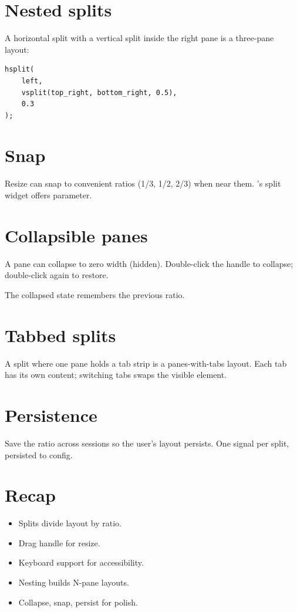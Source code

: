 \section{Nested splits}

A horizontal split with a vertical split inside the right
pane is a three-pane layout:

\begin{lstlisting}
hsplit(
    left,
    vsplit(top_right, bottom_right, 0.5),
    0.3
);
\end{lstlisting}

\section{Snap}

Resize can snap to convenient ratios (1/3, 1/2, 2/3) when
near them. \maya{}'s split widget offers 
parameter.

\section{Collapsible panes}

A pane can collapse to zero width (hidden). Double-click
the handle to collapse; double-click again to restore.

The collapsed state remembers the previous ratio.

\section{Tabbed splits}

A split where one pane holds a tab strip is a
panes-with-tabs layout. Each tab has its own content;
switching tabs swaps the visible element.

\section{Persistence}

Save the ratio across sessions so the user's layout
persists. One signal per split, persisted to config.

\section{Recap}

\begin{recap}
\begin{itemize}[leftmargin=*]
  \item Splits divide layout by ratio.
  \item Drag handle for resize.
  \item Keyboard support for accessibility.
  \item Nesting builds N-pane layouts.
  \item Collapse, snap, persist for polish.
\end{itemize}
\end{recap}


